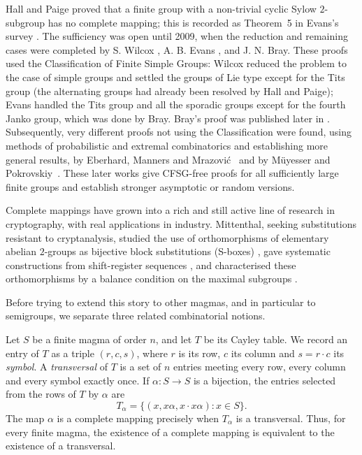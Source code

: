 \documentclass[11pt]{article}
\theoremstyle{plain}
\theoremstyle{remark}
\theoremstyle{definition}
\theoremstyle{plain}
\begin{document}
{\noindent Hall and Paige proved that a finite group with a non-trivial cyclic Sylow $2$-subgroup has no complete mapping; this is recorded as Theorem~5 in Evans's survey \cite[Theorem~5]{evans4}. The sufficiency was open until 2009, when the reduction and remaining cases were completed by S. Wilcox \cite[Theorem~24]{wilcox}, A. B. Evans \cite[Theorems~1--8]{evans}, and J. N. Bray. These proofs used the Classification of Finite Simple Groups: Wilcox reduced the problem to the case of simple groups and settled the groups of Lie type except for the Tits group (the alternating groups had already been resolved by Hall and Paige); Evans handled the Tits group and all the sporadic groups except for the fourth Janko group, which was done by Bray. Bray's proof was published later in \cite[Section~2]{bccsz}. Subsequently, very different proofs not using the Classification were found, using methods of probabilistic and extremal combinatorics and establishing more general results, by Eberhard, Manners and Mrazovi\'c~\cite[Theorem~1.2]{emm} and by M\"uyesser and Pokrovskiy~\cite[Theorem~1.1]{mp}. These later works give CFSG-free proofs for all sufficiently large finite groups and establish stronger asymptotic or random versions.}

{Complete mappings have grown into a rich and still active line of research in cryptography, with real applications in industry. Mittenthal, seeking substitutions resistant to cryptanalysis, studied the use of orthomorphisms of elementary abelian $2$-groups as bijective block substitutions (S-boxes) \cite[pp.~59--60]{Mittenthal}, gave systematic constructions from shift-register sequences \cite[Proposition~3]{Mittenthal}, and characterised these orthomorphisms by a balance condition on the maximal subgroups \cite[unnumbered theorem, p.~66]{Mittenthal}.}

\begingroup
Before trying to extend this story to other magmas, and in particular to
semigroups, we separate three related combinatorial notions.

Let $S$ be a finite magma of order $n$, and let $T$ be its Cayley table. We
record an entry of $T$ as a triple $(r,c,s)$, where $r$ is its row, $c$ its
column and $s=r\cdot c$ its {\em symbol}. A \emph{transversal} of $T$ is a set of
$n$ entries meeting every row, every column and every symbol exactly once.
If $\alpha\colon S\to S$ is a bijection, the entries selected from the rows
of $T$ by $\alpha$ are
\[
T_\alpha=\{(x,x\alpha,x\cdot x\alpha):x\in S\}.
\]
The map $\alpha$ is a complete mapping precisely when $T_\alpha$ is a
transversal. Thus, for every finite magma,  the existence of a complete mapping is equivalent to the
existence of a transversal.
\end{document}
